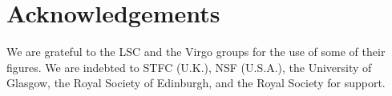 \documentclass{article}
\begin{document}

\bigskip


\section{Acknowledgements}
\label{section:acknowledgements}

We are grateful to the LSC and the Virgo groups for the use of some of their
figures. We are indebted to STFC (U.K.), NSF (U.S.A.), the University of
Glasgow, the Royal Society of Edinburgh, and the Royal Society for support.


\newpage


\end{document}
